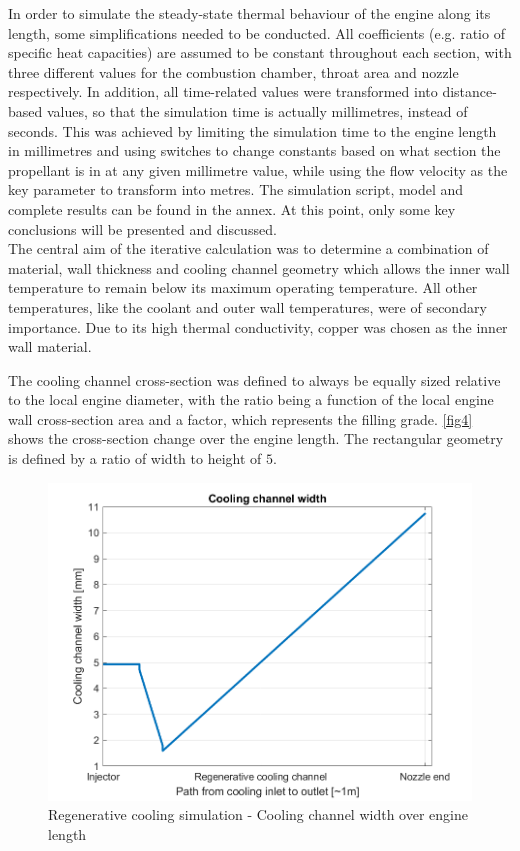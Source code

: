 In order to simulate the steady-state thermal behaviour of the engine along its length, some simplifications needed to be conducted. All coefficients (e.g. ratio of specific heat capacities) are assumed to be constant throughout each section, with three different values for the combustion chamber, throat area and nozzle respectively. In addition, all time-related values were transformed into distance-based values, so that the simulation time is actually millimetres, instead of seconds. This was achieved by limiting the simulation time to the engine length in millimetres and using switches to change constants based on what section the propellant is in at any given millimetre value, while using the flow velocity as the key parameter to transform into metres. The simulation script, model and complete results can be found in the annex. At this point, only some key conclusions will be presented and discussed.\\

The central aim of the iterative calculation was to determine a combination of material, wall thickness and cooling channel geometry which allows the inner wall temperature to remain below its maximum operating temperature. All other temperatures, like the coolant and outer wall temperatures, were of secondary importance. Due to its high thermal conductivity, copper was chosen as the inner wall material.

 The cooling channel cross-section was defined to always be equally sized relative to the local engine diameter, with the ratio being a function of the local engine wall cross-section area and a factor, which represents the filling grade. \autoref{fig4} shows the cross-section change over the engine length. The rectangular geometry is defined by a ratio of width to height of $5$.

\begin{figure}[H]
	\centering\includegraphics[width=0.9\linewidth]{coolingchannelwidth}
	\caption{Regenerative cooling simulation - Cooling channel width over engine length}\label{fig4}
\end{figure}

